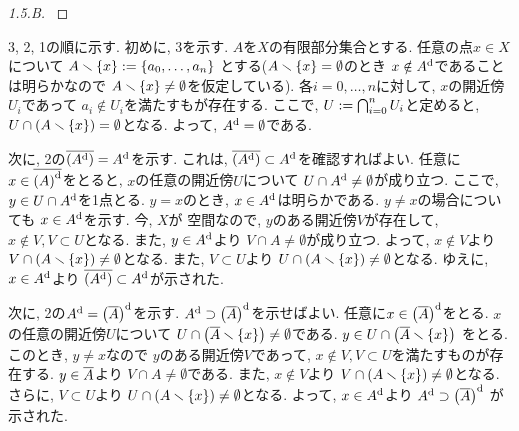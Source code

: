 \documentclass[uplatex, dvipdfmx, a4paper, 12pt, class=jsarticle, crop=false]{standalone}
\begin{document}
\begin{proof}[1.5.B]\label{eng-1-5-B-proof}

\end{proof}
	3, 2, 1の順に示す.
	初めに, 3を示す.
	\( A \)を\( X \)の有限部分集合とする.
	任意の点\( x \in X \)について
	\( A \setminus \lrbrace{x} \defeq \lrbrace{a_0, \ldots, a_n} \)
	とする(\( A \setminus \lrbrace{x} = \emptyset \)のとき
	\( x \notin A^{\mathrm{d}} \)であることは明らかなので
	\( A \setminus \lrbrace{x} \neq \emptyset \)を仮定している).
	各\( i = 0, \ldots, n \)に対して,
	\( x \)の開近傍\( U_i \)であって
	\( a_i \notin U_i \)を満たすもが存在する.
	ここで, \( U \mathrel{:=} \bigcap_{i=0}^n U_i \)と定めると,
	\( U \cap \lrparen{A \setminus \lrbrace{x}} = \emptyset \)となる.
	よって, \( A^{\mathrm{d}} = \emptyset \)である.

	次に, 2の\( \topbar{\lrparen{A^\topd}} = A^\topd \)を示す.
	これは, \( \topbar{\lrparen{A^\topd}}
	\subset A^\topd \)を確認すればよい.
	任意に\( x \in \topbar{\lrparen{A}^\topd} \)をとると,
	\( x \)の任意の開近傍\( U \)について
	\( U \cap A^{\mathrm{d}} \neq \emptyset \)が成り立つ.
	ここで, \( y \in U \cap A^{\mathrm{d}} \)を1点とる.
	\( y = x \)のとき, \( x \in A^{\mathrm{d}} \)は明らかである.
	\( y \neq x \)の場合についても
	\( x \in A^{\mathrm{d}} \)を示す.
	今, \( X \)が 空間なので,
	\( y \)のある開近傍\( V \)が存在して,
	\( x \notin V, V \subset U \)となる.
	また, \( y \in A^{\mathrm{d}} \)より
	\( V \cap A \neq \emptyset \)が成り立つ.
	よって, \( x \notin V \)より
	\( V \cap \lrparen{A \setminus \lrbrace{x}}
	\neq \emptyset \)となる.
	また, \( V \subset U \)より
	\( U \cap \lrparen{A \setminus \lrbrace{x}}
	\neq \emptyset \)となる.
	ゆえに, \( x \in A^{\mathrm{d}} \)より
	\( \topbar{\lrparen{A^\topd}}
	\subset A^\topd \)が示された.

	次に, 2の\( A^\topd = \lrparen{\topbar{A}}^\topd \)を示す.
	\( A^\topd \supset \lrparen{\topbar{A}}^\topd \)を示せばよい.
	任意に\( x \in \lrparen{\topbar{A}}^\topd \)をとる.
	\( x \)の任意の開近傍\( U \)について
	\( U \cap \lrparen{\topbar{A} \setminus \lrbrace{x}}
	\neq \emptyset \)である.
	\( y \in U \cap \lrparen{\topbar{A} \setminus \lrbrace{x}} \)
	をとる. このとき, \( y \neq x \)なので
	\( y \)のある開近傍\( V \)であって,
	\( x \notin V, V \subset U \)を満たすものが存在する.
	\( y \in \overline{A} \)より
	\( V \cap A \neq \emptyset \)である.
	また, \( x \notin V \)より
	\( V \cap \lrparen{A \setminus \lrbrace{x}}
	\neq \emptyset \)となる.
	さらに, \( V \subset U \)より
	\( U \cap \lrparen{A \setminus \lrbrace{x}}
	\neq \emptyset \)となる.
	よって, \( x \in A^{\mathrm{d}} \)より
	\( A^\topd \supset \lrparen{\topbar{A}}^\topd \)
	が示された.
\end{document}
